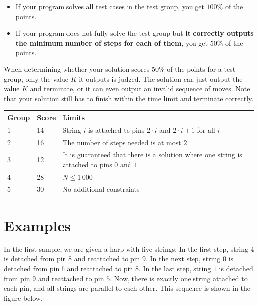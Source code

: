 \begin{itemize}
\item If your program solves all test cases in the test group, you get $100\%$ of the points.
\item If your program does not fully solve the test group but \textbf{it correctly outputs the minimum number of steps for each of them}, you get $50\%$ of the points.
\end{itemize}

When determining whether your solution scores $50\%$ of the points for a test group, only the value $K$ it outputs is judged. The solution can just output the value $K$ and terminate, or it can even output an invalid sequence of moves. Note that your solution still has to finish within the time limit and terminate correctly.

\begin{tabular}{|l|l|l|}
\hline
Group  &  Score  &  Limits \\
\hline
  1 & 14 & String $i$ is attached to pins $2\cdot i$ and $2\cdot i + 1$ for all $i$   \\
\hline
  2 & 16 & The number of steps needed is at most $2$   \\
\hline
  3 & 12 & It is guaranteed that there is a solution where one string is attached to pins $0$ and $1$   \\
\hline
 4 & 28 & $N \leq 1\,000$   \\
\hline
 5 & 30 & No additional constraints   \\
\hline
\end{tabular}
\section*{Examples}
In the first sample, we are given a harp with five strings.
In the first step, string $4$ is detached from pin $8$ and reattached to pin $9$.
In the next step, string $0$ is detached from pin $5$ and reattached to pin $8$.
In the last step, string $1$ is detached from pin $9$ and reattached to pin $5$.
Now, there is exactly one string attached to each pin, and all strings are parallel to each other.
This sequence is shown in the figure below.

